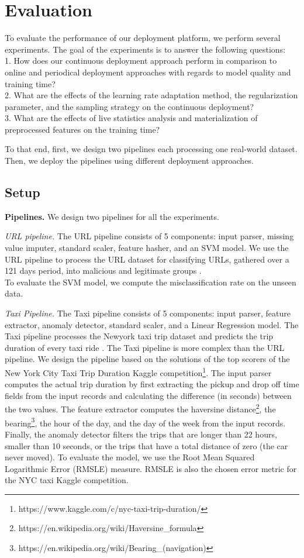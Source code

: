 \section{Evaluation} \label{evaluation} 
To evaluate the performance of our deployment platform, we perform several experiments.
The goal of the experiments is to answer the following questions:\\
1. How does our continuous deployment approach perform in comparison to online and periodical deployment approaches with regards to model quality and training time? \\
2. What are the effects of the learning rate adaptation method, the regularization parameter, and the sampling strategy on the continuous deployment? \\
3. What are the effects of live statistics analysis and materialization of preprocessed features on the training time?

To that end, first, we design two pipelines each processing one real-world dataset.
Then, we deploy the pipelines using different deployment approaches.

\subsection{Setup}\label{subsec:setup}
\textbf{Pipelines.}
We design two pipelines for all the experiments.

\textit{URL pipeline.} The URL pipeline consists of 5 components: input parser, missing value imputer, standard scaler, feature hasher, and an SVM model.
We use the URL pipeline to process the URL dataset for classifying URLs, gathered over a 121 days period, into malicious and legitimate groups \cite{ma2009identifying}.\\
To evaluate the SVM model, we compute the misclassification rate on the unseen data.

\textit{Taxi Pipeline.}
The Taxi pipeline consists of 5 components: input parser, feature extractor, anomaly detector, standard scaler, and a Linear Regression model.
The Taxi pipeline processes the Newyork taxi trip dataset and predicts the trip duration of every taxi ride \cite{newyork-taxi}. 
The Taxi pipeline is more complex than the URL pipeline. 
We design the pipeline based on the solutions of the top scorers of the New York City Taxi Trip Duration Kaggle competition\footnote{https://www.kaggle.com/c/nyc-taxi-trip-duration/}. 
The input parser computes the actual trip duration by first extracting the pickup and drop off time fields from the input records and calculating the difference (in seconds) between the two values.
The feature extractor computes the haversine distance\footnote{https://en.wikipedia.org/wiki/Haversine\_formula}, the bearing\footnote{https://en.wikipedia.org/wiki/Bearing\_(navigation)}, the hour of the day, and the day of the week from the input records. 
Finally, the anomaly detector filters the trips that are longer than 22 hours, smaller than 10 seconds, or the trips that have a total distance of zero (the car never moved).
To evaluate the model, we use the Root Mean Squared Logarithmic Error (RMSLE) measure.
RMSLE is also the chosen error metric for the NYC taxi Kaggle competition.

